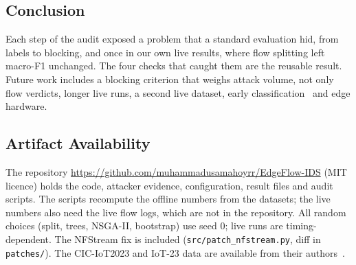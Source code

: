 \subsection{Conclusion}

Each step of the audit exposed a problem that a standard evaluation hid, from labels to blocking, and once in our own live results, where flow splitting left macro-F1 unchanged. The four checks that caught them are the reusable result. Future work includes a blocking criterion that weighs attack volume, not only flow verdicts, longer live runs, a second live dataset, early classification~\cite{pekar2025early} and edge hardware.

\subsection{Artifact Availability}

The repository \url{https://github.com/muhammadusamahoyrr/EdgeFlow-IDS} (MIT licence) holds the code, attacker evidence, configuration, result files and audit scripts. The scripts recompute the offline numbers from the datasets; the live numbers also need the live flow logs, which are not in the repository. All random choices (split, trees, NSGA-II, bootstrap) use seed 0; live runs are timing-dependent. The NFStream fix is included (\nolinkurl{src/patch_nfstream.py}, diff in \nolinkurl{patches/}).
The CIC-IoT2023 and IoT-23 data are available from their authors~\cite{neto2023ciciot2023,garcia2020iot23}.
